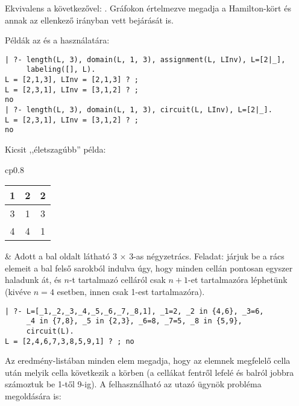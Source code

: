 \medskip

{}

Ekvivalens a következővel: . Gráfokon értelmezve
megadja a Hamilton-kört és annak az ellenkező irányban vett bejárását is.

Példák az  és a  használatára:

\begin{verbatim}
| ?- length(L, 3), domain(L, 1, 3), assignment(L, LInv), L=[2|_], 
     labeling([], L).
L = [2,1,3], LInv = [2,1,3] ? ;
L = [2,3,1], LInv = [3,1,2] ? ;
no
| ?- length(L, 3), domain(L, 1, 3), circuit(L, LInv), L=[2|_].
L = [2,3,1], LInv = [3,1,2] ? ;
no
\end{verbatim}

Kicsit ,,életszagúbb'' példa:

\medskip

\begin{tabular}{cp{}}
\begin{tabular}{|c|c|c|}
\hline 1 & 2 & 2 \\ \hline 3 & 1 & 3 \\ \hline 4 & 4 & 1 \\ \hline
\end{tabular} &
\vspace{-1.5\baselineskip}
Adott a bal oldalt látható 3 $\times$ 3-as négyzetrács. Feladat: járjuk be
a rács elemeit a bal felső sarokból indulva úgy, hogy minden cellán pontosan
egyszer haladunk át, és $n$-t tartalmazó celláról csak $n+1$-et tartalmazóra
léphetünk (kivéve $n=4$ esetben, innen csak 1-est tartalmazóra). \\
\end{tabular}

\begin{verbatim}
| ?- L=[_1,_2,_3,_4,_5,_6,_7,_8,1], _1=2, _2 in {4,6}, _3=6, 
     _4 in {7,8}, _5 in {2,3}, _6=8, _7=5, _8 in {5,9}, 
     circuit(L).
L = [2,4,6,7,3,8,5,9,1] ? ; no
\end{verbatim}

Az eredmény-listában minden elem megadja, hogy az elemnek megfelelő cella után
melyik cella következik a körben (a cellákat fentről lefelé és balról jobbra
számoztuk be 1-től 9-ig).
\br
A  felhasználható az utazó ügynök probléma megoldására is:

